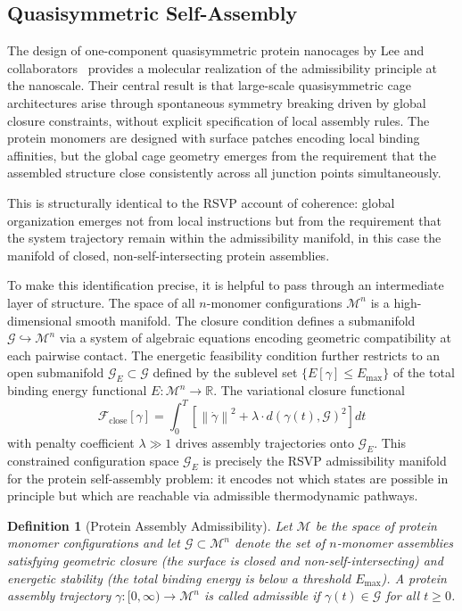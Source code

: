 \documentclass[11pt, oneside]{article}
\numberwithin{equation}{section}
\theoremstyle{rsvpstyle}
\newtheorem{definition}[theorem]{Definition}
\theoremstyle{remark}
\newcommand{\Rspace}{\mathbb{R}}
\newcommand{\norm}[1]{\left\lVert #1 \right\rVert}
\begin{document}
\subsection{Quasisymmetric Self-Assembly}

The design of one-component quasisymmetric protein nanocages by Lee and
collaborators~\cite{Lee2026Nanocages} provides a molecular realization of the
admissibility principle at the nanoscale. Their central result is that large-scale
quasisymmetric cage architectures arise through spontaneous symmetry breaking driven
by global closure constraints, without explicit specification of local assembly rules.
The protein monomers are designed with surface patches encoding local binding affinities,
but the global cage geometry emerges from the requirement that the assembled structure
close consistently across all junction points simultaneously.

This is structurally identical to the RSVP account of coherence: global organization
emerges not from local instructions but from the requirement that the system trajectory
remain within the admissibility manifold, in this case the manifold of closed,
non-self-intersecting protein assemblies.

To make this identification precise, it is helpful to pass through an intermediate
layer of structure. The space of all $n$-monomer configurations $\mathcal{M}^n$ is a
high-dimensional smooth manifold. The closure condition defines a submanifold
$\mathcal{G} \hookrightarrow \mathcal{M}^n$ via a system of algebraic equations
encoding geometric compatibility at each pairwise contact. The energetic feasibility
condition further restricts to an open submanifold $\mathcal{G}_E \subset \mathcal{G}$
defined by the sublevel set $\{E[\gamma] \leq E_\text{max}\}$ of the total binding
energy functional $E : \mathcal{M}^n \to \Rspace$. The variational closure functional
\begin{equation}
  \mathcal{F}_\text{close}[\gamma] = \int_0^T \left[ \norm{\dot\gamma}^2 +
  \lambda \cdot d(\gamma(t), \mathcal{G})^2 \right] dt
\end{equation}
with penalty coefficient $\lambda \gg 1$ drives assembly trajectories onto
$\mathcal{G}_E$. This constrained configuration space $\mathcal{G}_E$ is precisely
the RSVP admissibility manifold for the protein self-assembly problem: it encodes not
which states are possible in principle but which are reachable via admissible
thermodynamic pathways.


\begin{definition}[Protein Assembly Admissibility]
Let $\mathcal{M}$ be the space of protein monomer configurations and let
$\mathcal{G} \subset \mathcal{M}^n$ denote the set of $n$-monomer assemblies satisfying
geometric closure (the surface is closed and non-self-intersecting) and energetic
stability (the total binding energy is below a threshold $E_\text{max}$). A protein
assembly trajectory $\gamma : [0,\infty) \to \mathcal{M}^n$ is called admissible if
$\gamma(t) \in \mathcal{G}$ for all $t \geq 0$.
\end{definition}
\end{document}
